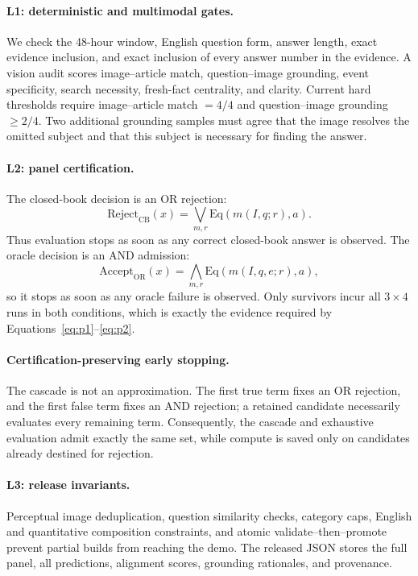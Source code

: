 \documentclass{article}
\begin{document}
\paragraph{L1: deterministic and multimodal gates.}
We check the 48-hour window, English question form, answer length, exact
evidence inclusion, and exact inclusion of every answer number in the
evidence.
A vision audit scores image--article match, question--image grounding, event
specificity, search necessity, fresh-fact centrality, and clarity.
Current hard thresholds require image--article match $=4/4$ and
question--image grounding $\ge2/4$.
Two additional grounding samples must agree that the image resolves the
omitted subject and that this subject is necessary for finding the answer.

\paragraph{L2: panel certification.}
The closed-book decision is an OR rejection:
\begin{equation}
\mathrm{Reject}_{\mathrm{CB}}(x)
=\bigvee_{m,r}\mathrm{Eq}(m(I,q;r),a).
\end{equation}
Thus evaluation stops as soon as any correct closed-book answer is observed.
The oracle decision is an AND admission:
\begin{equation}
\mathrm{Accept}_{\mathrm{OR}}(x)
=\bigwedge_{m,r}\mathrm{Eq}(m(I,q,e;r),a),
\end{equation}
so it stops as soon as any oracle failure is observed.
Only survivors incur all $3\times4$ runs in both conditions, which is exactly
the evidence required by Equations~\ref{eq:p1}--\ref{eq:p2}.

\paragraph{Certification-preserving early stopping.}
The cascade is not an approximation.
The first true term fixes an OR rejection, and the first false term fixes an
AND rejection; a retained candidate necessarily evaluates every remaining
term.
Consequently, the cascade and exhaustive evaluation admit exactly the same
set, while compute is saved only on candidates already destined for
rejection.

\paragraph{L3: release invariants.}
Perceptual image deduplication, question similarity checks, category caps,
English and quantitative composition constraints, and atomic
validate--then--promote prevent partial builds from reaching the demo.
The released JSON stores the full panel, all predictions, alignment scores,
grounding rationales, and provenance.
\end{document}
